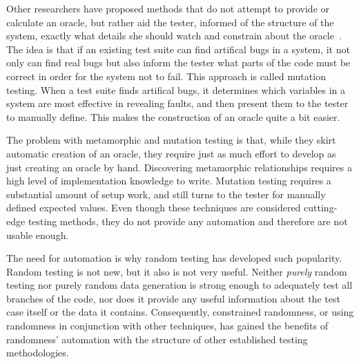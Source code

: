 Other researchers have proposed methods that do not attempt to provide or calculate an oracle, but rather aid the tester, informed of the structure of the system, exactly what details she should watch and constrain about the oracle~\cite{Patrick:2016:ATI:2970276.2970333,Souza:2016:SMT:2897010.2897012,Harman:2011:SHO:2025113.2025144,Staats:2012:AOC:2337223.2337326}. The idea is that if an existing test suite can find artifical bugs in a system, it not only can find real bugs but also inform the tester what parts of the code must be correct in order for the system not to fail. This approach is called mutation testing. When a test suite finds artifical bugs, it determines which variables in a system are most effective in revealing faults, and then present them to the tester to manually define. This makes the construction of an oracle quite a bit easier.

The problem with metamorphic and mutation testing is that, while they skirt automatic creation of an oracle, they require just as much effort to develop as just creating an oracle by hand. Discovering metamorphic relationships requires a high level of implementation knowledge to write. Mutation testing requires a substantial amount of setup work, and still turns to the tester for manually defined expected values. Even though these techniques are considered cutting-edge testing methods, they do not provide any automation and therefore are not usable enough.

The need for automation is why random testing has developed such popularity. Random testing is not new, but it also is not very useful. Neither \textit{purely} random testing nor purely random data generation is strong enough to adequately test all branches of the code, nor does it provide any useful information about the test case itself or the data it contains. Consequently, constrained randomness, or using randomness in conjunction with other techniques, has gained the benefits of randomness' automation with the structure of other established testing methodologies.

